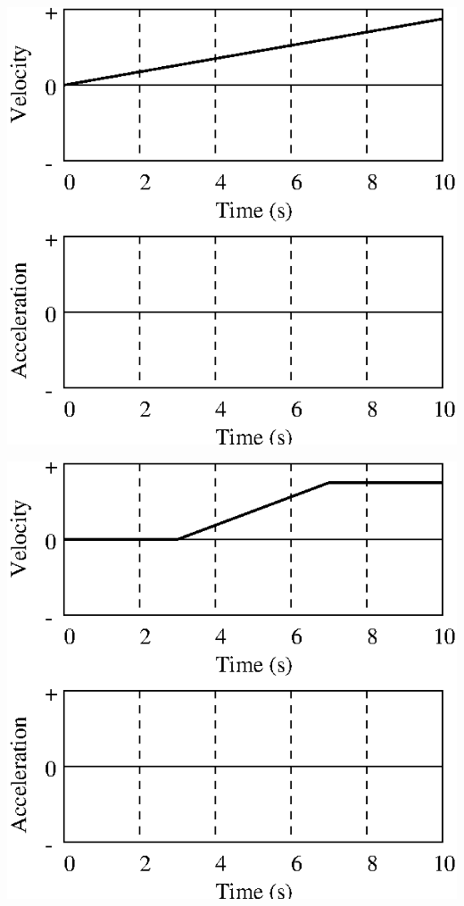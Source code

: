 \vspace{0.3cm}
{\par\centering \includegraphics{changing/changing_fig8.eps} \par}
\vspace{0.3cm}

\vspace{0.3cm}
{\par\centering \includegraphics{changing/changing_fig9.eps} \par}
\vspace{0.3cm}

